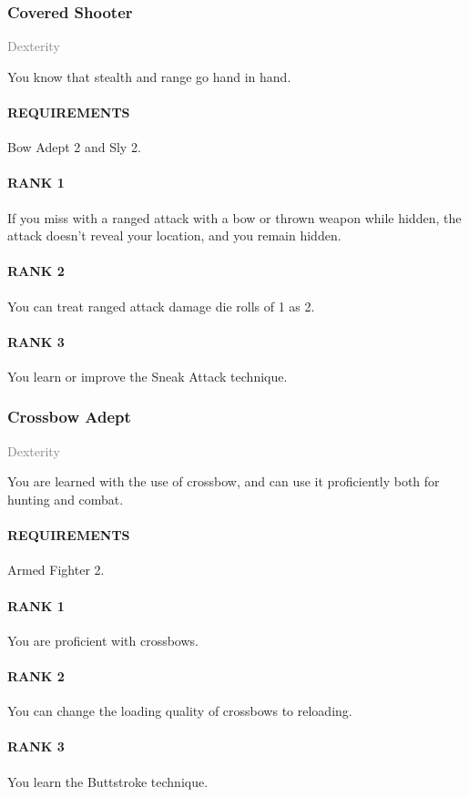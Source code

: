 \subsubsection{Covered Shooter} \label{feat::coveredshooter}
\small{\textcolor{gray}{Dexterity}}

\normalsize
You know that stealth and range go hand in hand.
\paragraph{REQUIREMENTS} Bow Adept 2 and Sly 2.
\paragraph{RANK 1} If you miss with a ranged attack with a bow or thrown weapon while hidden, the attack doesn't reveal your location, and you remain hidden.
\paragraph{RANK 2} You can treat ranged attack damage die rolls of 1 as 2.
\paragraph{RANK 3} You learn or improve the Sneak Attack technique.

\subsubsection{Crossbow Adept} \label{feat::crossbowadept}
\small{\textcolor{gray}{Dexterity}}

\normalsize
You are learned with the use of crossbow, and can use it proficiently both for hunting and combat.
\paragraph{REQUIREMENTS} Armed Fighter 2.
\paragraph{RANK 1} You are proficient with crossbows.
\paragraph{RANK 2} You can change the loading quality of crossbows to reloading.
\paragraph{RANK 3} You learn the Buttstroke technique.

